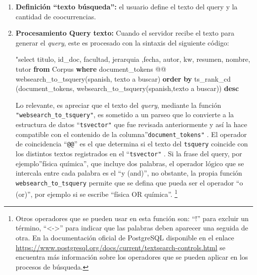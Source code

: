 \documentclass[
  12pt,
  openany]{book}
\newenvironment{Shaded}{\begin{snugshade}}{\end{snugshade}}
\newcommand{\KeywordTok}[1]{\textcolor[rgb]{0.13,0.29,0.53}{\textbf{#1}}}
\newcommand{\NormalTok}[1]{#1}
\newcommand{\OtherTok}[1]{\textcolor[rgb]{0.56,0.35,0.01}{#1}}
\newcommand{\StringTok}[1]{\textcolor[rgb]{0.31,0.60,0.02}{#1}}
\begin{document}
\begin{enumerate}
\def\labelenumi{\arabic{enumi}.}
\item
  \textbf{Definición ``texto búsqueda'':} el usuario define el texto del query y la cantidad de coocurrencias.
\item
  \textbf{Procesamiento Query texto:} Cuando el servidor recibe el texto para generar el \emph{query}, este es procesado con la sintaxis del siguiente código:

\begin{Shaded}
\begin{Highlighting}[]
\OtherTok{"select titulo, id\_doc, facultad, jerarquia ,fecha,}
\NormalTok{  autor, kw, resumen, nombre, tutor }\KeywordTok{from}\NormalTok{ Corpus }\KeywordTok{where}
\NormalTok{  document\_tokens @@ websearch\_to\_tsquery(}\StringTok{\textquotesingle{}spanish\textquotesingle{}}\NormalTok{,}
    \StringTok{\textquotesingle{}texto a buscar\textquotesingle{}}\NormalTok{) }
  \KeywordTok{order} \KeywordTok{by}\NormalTok{ ts\_rank\_cd (document\_tokens,}
\NormalTok{    websearch\_to\_tsquery(}\StringTok{\textquotesingle{}spanish\textquotesingle{}}\NormalTok{,}\StringTok{\textquotesingle{}texto a buscar\textquotesingle{}}\NormalTok{)) }\KeywordTok{desc}
\end{Highlighting}
\end{Shaded}

  Lo relevante, es apreciar que el texto del \emph{query}, mediante la función \texttt{"websearch\_to\_tsquery"}, es sometido a un parseo que lo convierte a la estructura de datos ``\texttt{tsvector"} que fue revisada anteriormente y así la hace compatible con el contenido de la columna''\texttt{document\_tokens"} . El operador de coincidencia ``\texttt{@@}'' es el que determina si el texto del \texttt{tsquery} coincide con los distintos textos registrados en el ``\texttt{tsvector"} . Si la frase del query, por ejemplo''física química'', que incluye dos palabras, el operador lógico que se intercala entre cada palabra es el ``y (and)'', no obstante, la propia función \texttt{websearch\_to\_tsquery} permite que se defina que pueda ser el operador ``o (or)'', por ejemplo si se escribe ``física OR química''. \footnote{Otros operadores que se pueden usar en esta función son: ``!'' para excluir un término, ``\textless-\textgreater{}'' para indicar que las palabras deben aparecer una seguida de otra. En la documentación oficial de PostgreSQL disponible en el enlace \url{https://www.postgresql.org/docs/current/textsearch-controls.html} se encuentra más información sobre los operadores que se pueden aplicar en los procesos de búsqueda.}


\end{enumerate}
\end{document}
